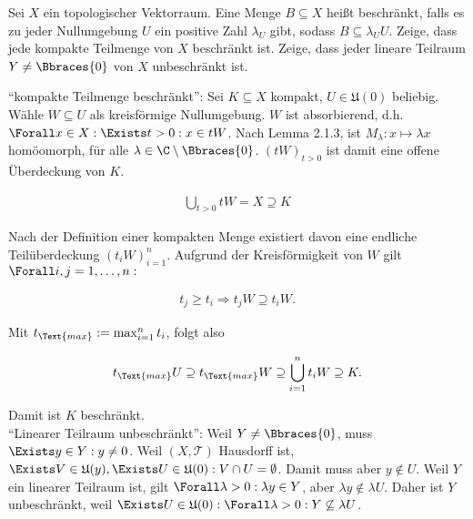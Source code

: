 \begin{exercise}

Sei $X$ ein topologischer Vektorraum.
Eine Menge $B \subseteq X$ heißt beschränkt, falls es zu jeder Nullumgebung $U$ ein positive Zahl $\lambda_U$ gibt, sodass $B \subseteq \lambda_U U$.
Zeige, dass jede kompakte Teilmenge von $X$ beschränkt ist. Zeige, dass jeder lineare Teilraum $Y \neq \Bbraces{0}$ von $X$ unbeschränkt ist.

\end{exercise}

\begin{solution}

\phantom{}

\enquote{kompakte Teilmenge beschränkt}:
Sei $K \subseteq X$ kompakt, $U \in \mathfrak{U}(0)$ beliebig.
Wähle $W \subseteq U$ als kreisförmige Nullumgebung.
$W$ ist absorbierend, d.h. $\Forall x \in X: \Exists t > 0: x \in tW$.
Nach Lemma 2.1.3, ist $M_\lambda: x \mapsto \lambda x$ homöomorph, für alle $ \lambda \in \C \setminus \Bbraces{0}$.
$(tW)_{t > 0}$ ist damit eine offene Überdeckung von $K$.

\begin{align*}
  \bigcup_{t > 0} tW = X \supseteq K
\end{align*}

Nach der Definition einer kompakten Menge existiert davon eine endliche Teilüberdeckung $(t_i W)_{i=1}^n$.
Aufgrund der Kreisförmigkeit von $W$ gilt $\Forall i, j = 1, \ldots, n:$

\begin{align*}
  t_j \geq t_i
  \Rightarrow
  t_j W \supseteq t_i W.
\end{align*}

Mit $t_\Text{max} := \max_{i=1}^n t_i$, folgt also

\begin{align*}
  t_\Text{max} U
  \supseteq
  t_\Text{max} W
  \supseteq
  \bigcup_{i=1}^n t_i W
  \supseteq
  K.
\end{align*}

Damit ist $K$ beschränkt. \\

\enquote{Linearer Teilraum unbeschränkt}:
Weil $Y \neq \Bbraces{0}$, muss $\Exists y \in Y: y \neq 0$. Weil $(X, \mathcal{T})$ Hausdorff ist, $\Exists V \in \mathfrak{U}(y), \Exists U \in \mathfrak{U}(0): V \cap U = \emptyset$.
Damit muss aber $y \notin U$.
Weil $Y$ ein linearer Teilraum ist, gilt $\Forall \lambda > 0: \lambda y \in Y$, aber $\lambda y \notin \lambda U$.
Daher ist $Y$ unbeschränkt, weil $\Exists U \in \mathfrak{U}(0): \Forall \lambda > 0: Y \not \subseteq \lambda U$.

\end{solution}
